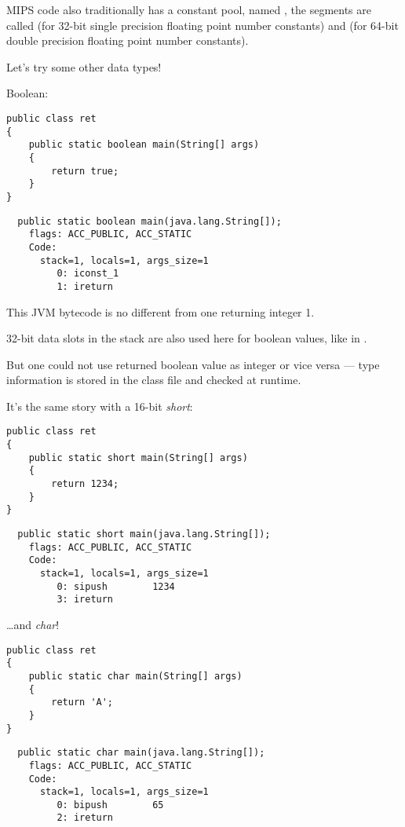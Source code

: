 MIPS code also traditionally has a constant pool, named , the segments
are called  (for 32-bit single precision floating point number constants) and 
(for 64-bit double precision floating point number constants).

Let's try some other data types!

Boolean:

\begin{lstlisting}[style=customjava]
public class ret
{
	public static boolean main(String[] args)
	{
		return true;
	}
}
\end{lstlisting}

\begin{lstlisting}
  public static boolean main(java.lang.String[]);
    flags: ACC_PUBLIC, ACC_STATIC
    Code:
      stack=1, locals=1, args_size=1
         0: iconst_1
         1: ireturn
\end{lstlisting}

This JVM bytecode is no different from one returning integer 1.

32-bit data slots in the stack are also used here for boolean values, like in \CCpp.

But one could not use returned boolean value as integer or vice versa --- type information is stored in the class file and checked at runtime.

It's the same story with a 16-bit \emph{short}:

\begin{lstlisting}[style=customjava]
public class ret
{
	public static short main(String[] args)
	{
		return 1234;
	}
}
\end{lstlisting}

\begin{lstlisting}
  public static short main(java.lang.String[]);
    flags: ACC_PUBLIC, ACC_STATIC
    Code:
      stack=1, locals=1, args_size=1
         0: sipush        1234
         3: ireturn
\end{lstlisting}

\dots and \emph{char}!

\begin{lstlisting}[style=customjava]
public class ret
{
	public static char main(String[] args)
	{
		return 'A';
	}
}
\end{lstlisting}

\begin{lstlisting}
  public static char main(java.lang.String[]);
    flags: ACC_PUBLIC, ACC_STATIC
    Code:
      stack=1, locals=1, args_size=1
         0: bipush        65
         2: ireturn
\end{lstlisting}

